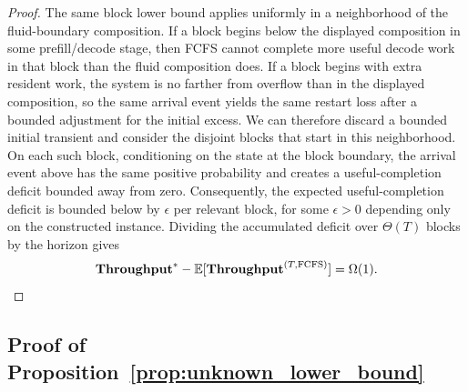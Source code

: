 \begin{proof}
The same block lower bound applies uniformly in a neighborhood of the fluid-boundary composition. If a block begins below the displayed composition in some prefill/decode stage, then FCFS cannot complete more useful decode work in that block than the fluid composition does. If a block begins with extra resident work, the system is no farther from overflow than in the displayed composition, so the same arrival event yields the same restart loss after a bounded adjustment for the initial excess. We can therefore discard a bounded initial transient and consider the disjoint blocks that start in this neighborhood. On each such block, conditioning on the state at the block boundary, the arrival event above has the same positive probability and creates a useful-completion deficit bounded away from zero. Consequently, the expected useful-completion deficit is bounded below by \(\epsilon\) per relevant block, for some \(\epsilon>0\) depending only on the constructed instance. Dividing the accumulated deficit over \(\Theta(T)\) blocks by the horizon gives
\[
    \textbf{Throughput}^*-\mathbb E[\textbf{Throughput}^{(T,\mathrm{FCFS})}]
    =\Omega(1).
\]
\end{proof}

\subsection{Proof of Proposition~\ref{prop:unknown_lower_bound}}
\label{appendix:proof_unknown_lower_bound}

